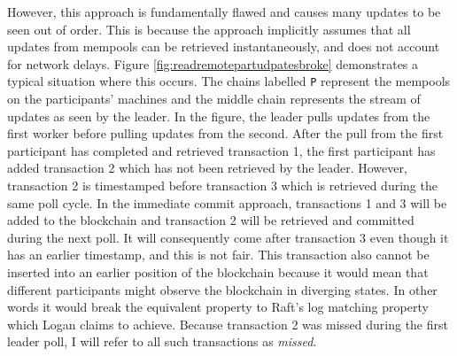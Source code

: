 \documentclass[12pt,a4paper,twoside,openright]{report}
\begin{document}
	However, this approach is fundamentally flawed and causes many updates to be seen out of order. 
	This is because the approach implicitly assumes that all updates from mempools can be retrieved instantaneously, and does not account for network delays.
	Figure \ref{fig:readremotepartudpatesbroke} demonstrates a typical situation where this occurs.
	The chains labelled \texttt{P} represent the mempools on the participants' machines and the middle chain represents the stream of updates as seen by the leader.
	In the figure, the leader pulls updates from the first worker before pulling updates from the second.
	After the pull from the first participant has completed and retrieved transaction 1, the first participant has added transaction 2 which has not been retrieved by the leader. 
	However, transaction 2 is timestamped before transaction 3 which is retrieved during the same poll cycle.
	In the immediate commit approach, transactions 1 and 3 will be added to the blockchain and transaction 2 will be retrieved and committed during the next poll.
	It will consequently come after transaction 3 even though it has an earlier timestamp, and this is not fair.
	This transaction also cannot be inserted into an earlier position of the blockchain because it would mean that different participants might observe the blockchain in diverging states.
	In other words it would break the equivalent property to Raft's log matching property which Logan claims to achieve.
	Because transaction 2 was missed during the first leader poll, I will refer to all such transactions as \textit{missed}.
\end{document}
